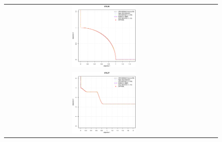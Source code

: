 \begin{figure}[H]
\begin{tabular}{ccc}
  \includegraphics[width=0.33\textwidth]{Figures_Chapter7/Results_Chapter4/Surface_eps_VSD_MOEA/DTLZ6.eps} \\
  \includegraphics[width=0.33\textwidth]{Figures_Chapter7/Results_Chapter4/Surface_eps_VSD_MOEA/DTLZ7.eps} 
\end{tabular}
\end{figure}

